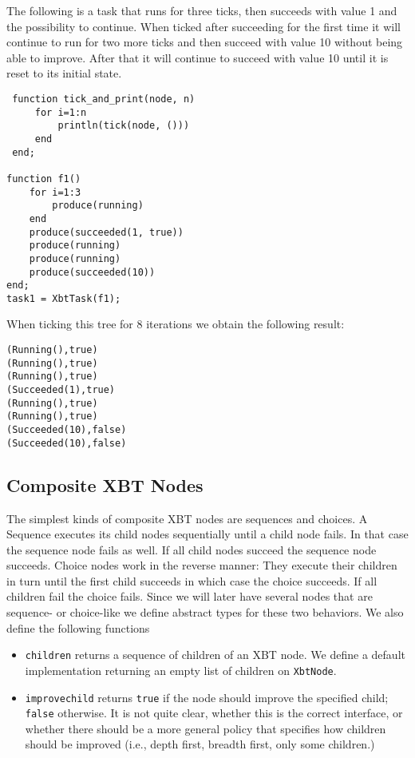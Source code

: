 \documentclass[a4wide]{article}
\begin{document}
The following is a task that runs for three ticks, then succeeds
with value 1 and the possibility to continue.  When ticked after
succeeding for the first time it will continue to run for two more
ticks and then succeed with value 10 without being able to improve.
After that it will continue to succeed with value 10 until it is
reset to its initial state.

\begin{verbatim}
 function tick_and_print(node, n)
     for i=1:n
         println(tick(node, ()))
     end
 end;

function f1()
    for i=1:3
        produce(running)
    end
    produce(succeeded(1, true))
    produce(running)
    produce(running)
    produce(succeeded(10))
end;
task1 = XbtTask(f1);
\end{verbatim}

When ticking this tree for 8 iterations we obtain the following
result:

\begin{verbatim}
(Running(),true)
(Running(),true)
(Running(),true)
(Succeeded(1),true)
(Running(),true)
(Running(),true)
(Succeeded(10),false)
(Succeeded(10),false)
\end{verbatim}

\subsection{Composite XBT Nodes}
\label{sec-3-5}

The simplest kinds of composite XBT nodes are sequences and
choices.  A Sequence executes its child nodes sequentially until a
child node fails.  In that case the sequence node fails as well.
If all child nodes succeed the sequence node succeeds.  Choice
nodes work in the reverse manner: They execute their children in
turn until the first child succeeds in which case the choice
succeeds.  If all children fail the choice fails.  Since we will
later have several nodes that are sequence- or choice-like we
define abstract types for these two behaviors.  We also define
the following functions

\begin{itemize}
\item \verb~children~ returns a sequence of children of an XBT node.  We
define a default implementation returning an empty list of
children on \verb~XbtNode~.
\item \verb~improvechild~ returns \verb~true~ if the node should improve the
specified child; \verb~false~ otherwise.  It is not quite clear,
whether this is the correct interface, or whether there should be
a more general policy that specifies how children should be
improved (i.e., depth first, breadth first, only some children.)
\end{itemize}
\end{document}
